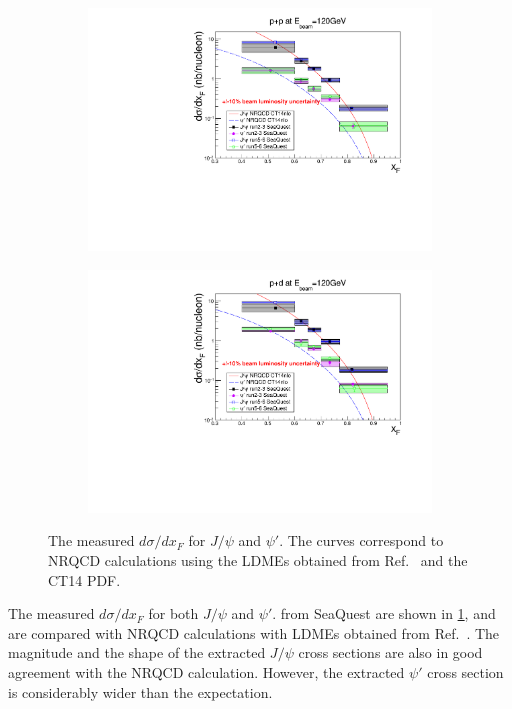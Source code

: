\documentclass[reprint,aps,unsortedaddress,superscriptaddress,prd,floatfix,showpacs,linenumbers]{revtex4-2}
\begin{document}
\begin{figure}
	\begin{subfigure}{0.45\linewidth}
		\includegraphics[width=\linewidth]{figures/crossSections/xF/combine_xF_LH2_5-6_5770_psip}
	\end{subfigure}
	\begin{subfigure}{0.45\linewidth}
		\includegraphics[width=\linewidth]{figures/crossSections/xF/combine_xF_LD2_5-6_5770_psip}
	\end{subfigure}
	\caption{The measured $d\sigma /d x_F$ for $J/\psi$ and $\psi'$. The curves correspond to NRQCD
		calculations using the LDMEs obtained from Ref.~\cite{hsieh2021} and the CT14 PDF.}
	\label{fig:xF_cross_sections}
\end{figure}
The measured $d\sigma /d x_F$ for both $J/\psi$ and $\psi'$. from SeaQuest are shown in 
\cref{fig:xF_cross_sections}, and are compared with NRQCD calculations with LDMEs obtained
from Ref.~\cite{hsieh2021}. The magnitude and the shape of the extracted $J/\psi$ cross
sections are also in good agreement with the NRQCD calculation. However, the extracted 
$\psi'$ cross section is considerably wider than the expectation.
\end{document}
